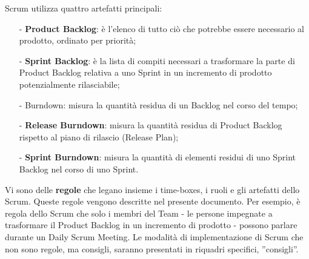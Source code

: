 Scrum  utilizza  quattro artefatti principali:\begin{itemize}
\item[-] \textbf{Product Backlog}: \`e l'elenco di tutto ci\`o che potrebbe essere necessario al prodotto, ordinato per
priorit\`a;
\item[-] \textbf{Sprint Backlog}: \`e la lista di compiti necessari a trasformare la parte di Product Backlog relativa a uno
Sprint in un incremento di prodotto potenzialmente rilasciabile;
\item[-] Burndown:  misura la quantit\`a residua di un Backlog nel corso del tempo;
\item[-] \textbf{Release Burndown}: misura la quantit\`a residua di Product Backlog rispetto al piano di rilascio (Release Plan);
\item[-] \textbf{Sprint Burndown}: misura la quantit\`a  di elementi residui di uno Sprint Backlog
nel corso  di uno  Sprint.
\end{itemize}

Vi sono delle \textbf{regole} che legano insieme i time-boxes, i ruoli e gli artefatti dello Scrum. Queste regole vengono
descritte nel presente documento. Per esempio, \`e regola dello Scrum che solo i membri del Team - le persone impegnate
a trasformare il Product Backlog in un incremento di prodotto - possono parlare durante un Daily Scrum Meeting. Le
modalit\`a di implementazione di Scrum che non sono regole, ma consigli, saranno presentati in riquadri specifici,
''consigli''.
\vspace{0.4cm}

